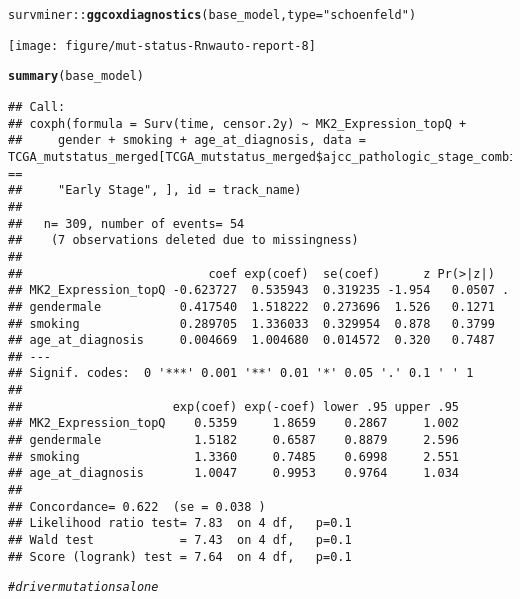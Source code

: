 \documentclass{article}\usepackage[]{graphicx}\usepackage[]{color}
\makeatletter
\newcommand{\hlstr}[1]{\textcolor[rgb]{0.192,0.494,0.8}{#1}}%
\newcommand{\hlcom}[1]{\textcolor[rgb]{0.678,0.584,0.686}{\textit{#1}}}%
\newcommand{\hlopt}[1]{\textcolor[rgb]{0,0,0}{#1}}%
\newcommand{\hlstd}[1]{\textcolor[rgb]{0.345,0.345,0.345}{#1}}%
\newcommand{\hlkwc}[1]{\textcolor[rgb]{0.333,0.667,0.333}{#1}}%
\newcommand{\hlkwd}[1]{\textcolor[rgb]{0.737,0.353,0.396}{\textbf{#1}}}%
\newenvironment{kframe}{%
 \def\at@end@of@kframe{}%
 \ifinner\ifhmode%
  \def\at@end@of@kframe{\end{minipage}}%
  \begin{minipage}{\columnwidth}%
 \fi\fi%
 \def\FrameCommand##1{\hskip\@totalleftmargin \hskip-\fboxsep
 \colorbox{shadecolor}{##1}\hskip-\fboxsep
     \hskip-\linewidth \hskip-\@totalleftmargin \hskip\columnwidth}%
 \MakeFramed {\advance\hsize-\width
   \@totalleftmargin\z@ \linewidth\hsize
   \@setminipage}}%
 {\par\unskip\endMakeFramed%
 \at@end@of@kframe}
\newenvironment{knitrout}{}{} %
\makeatother
\begin{document}
\begin{knitrout}
{}


\begin{kframe}\begin{alltt}
\hlstd{survminer}\hlopt{::}\hlkwd{ggcoxdiagnostics}\hlstd{(base_model,} \hlkwc{type}\hlstd{=}\hlstr{"schoenfeld"}\hlstd{)}
\end{alltt}


{\ttfamily\noindent\itshape{}}\end{kframe}

{\centering \texttt{[image: figure/mut-status-Rnwauto-report-8]} 

}


\begin{kframe}\begin{alltt}
\hlkwd{summary}\hlstd{(base_model)}
\end{alltt}
\begin{verbatim}
## Call:
## coxph(formula = Surv(time, censor.2y) ~ MK2_Expression_topQ + 
##     gender + smoking + age_at_diagnosis, data = TCGA_mutstatus_merged[TCGA_mutstatus_merged$ajcc_pathologic_stage_combined == 
##     "Early Stage", ], id = track_name)
## 
##   n= 309, number of events= 54 
##    (7 observations deleted due to missingness)
## 
##                          coef exp(coef)  se(coef)      z Pr(>|z|)  
## MK2_Expression_topQ -0.623727  0.535943  0.319235 -1.954   0.0507 .
## gendermale           0.417540  1.518222  0.273696  1.526   0.1271  
## smoking              0.289705  1.336033  0.329954  0.878   0.3799  
## age_at_diagnosis     0.004669  1.004680  0.014572  0.320   0.7487  
## ---
## Signif. codes:  0 '***' 0.001 '**' 0.01 '*' 0.05 '.' 0.1 ' ' 1
## 
##                     exp(coef) exp(-coef) lower .95 upper .95
## MK2_Expression_topQ    0.5359     1.8659    0.2867     1.002
## gendermale             1.5182     0.6587    0.8879     2.596
## smoking                1.3360     0.7485    0.6998     2.551
## age_at_diagnosis       1.0047     0.9953    0.9764     1.034
## 
## Concordance= 0.622  (se = 0.038 )
## Likelihood ratio test= 7.83  on 4 df,   p=0.1
## Wald test            = 7.43  on 4 df,   p=0.1
## Score (logrank) test = 7.64  on 4 df,   p=0.1
\end{verbatim}
\begin{alltt}
\hlcom{# driver mutations alone}


\end{alltt}
\end{kframe}
\end{knitrout}
\end{document}

